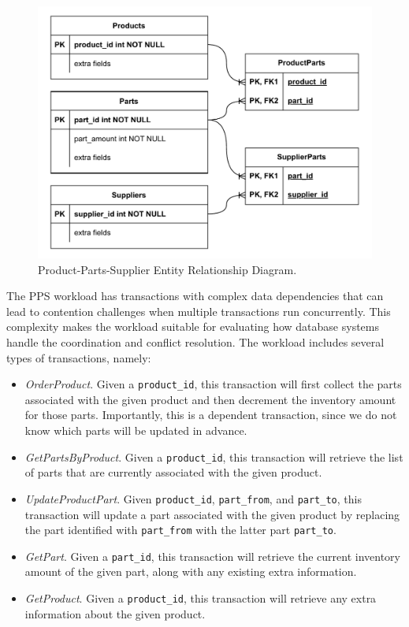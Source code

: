 \documentclass{article}
\begin{document}
\begin{figure}[ht]
    \centering
    \includegraphics[width=1\linewidth]{figures/PPS ERD.pdf}
    \caption{Product-Parts-Supplier Entity Relationship Diagram.}
    \label{fig: pps-erd}
\end{figure}

The PPS workload has transactions with complex data dependencies that can lead to contention challenges when multiple transactions run concurrently. This complexity makes the workload suitable for evaluating how database systems handle the coordination and conflict resolution. The workload includes several types of transactions, namely:
\begin{itemize}
    \item \textit{OrderProduct}. Given a \texttt{product\_id}, this transaction will first collect the parts associated with the given product and then decrement the inventory amount for those parts. Importantly, this is a dependent transaction, since we do not know which parts will be updated in advance.
    \item \textit{GetPartsByProduct}. Given a \texttt{product\_id}, this transaction will retrieve the list of parts that are currently associated with the given product.
    \item \textit{UpdateProductPart}. Given \texttt{product\_id}, \texttt{part\_from}, and \texttt{part\_to}, this transaction will update a part associated with the given product by replacing the part identified with \texttt{part\_from} with the latter part \texttt{part\_to}.
    \item \textit{GetPart}. Given a \texttt{part\_id}, this transaction will retrieve the current inventory amount of the given part, along with any existing extra information.
    \item \textit{GetProduct}. Given a \texttt{product\_id}, this transaction will retrieve any extra information about the given product.
\end{itemize}
\end{document}
